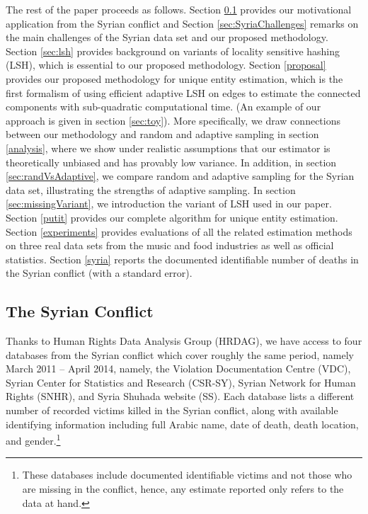 \documentclass{imsart}
\begin{document}
The rest of the paper proceeds as follows. Section \ref{syriadata} provides our motivational application from the Syrian conflict
and Section \ref{sec:SyriaChallenges} remarks on the main challenges of the Syrian data set and our proposed methodology. Section \ref{sec:lsh} provides background on variants of locality sensitive hashing (LSH), which is essential to our proposed methodology.  Section \ref{proposal} provides our proposed methodology for unique entity estimation, which is the first formalism of using efficient adaptive LSH on edges to estimate the connected components with sub-quadratic computational time. (An example of our approach is given in section \ref{sec:toy}). More specifically, we draw connections between our methodology and
 random and adaptive sampling in section \ref{analysis}, where we show under realistic assumptions that our estimator is theoretically unbiased and has provably low variance. In addition, in section \ref{sec:randVsAdaptive}, we compare random and adaptive sampling for the Syrian data set, illustrating the strengths of adaptive sampling. In section \ref{sec:missingVariant}, we introduction the variant of LSH used in our paper. Section \ref{putit} provides our complete algorithm for unique entity estimation.
Section \ref{experiments} provides evaluations of all the related estimation methods on three real data sets from the music and food industries as well as official statistics. Section \ref{syria} reports the documented identifiable number of deaths in the Syrian conflict (with a standard error).



\subsection{The Syrian Conflict}
\label{syriadata}
Thanks to Human Rights Data Analysis Group (HRDAG), we have access to four databases from the Syrian conflict which cover roughly the same period, namely March 2011 -- April 2014, namely, the Violation Documentation Centre (VDC), Syrian Center for Statistics and Research (CSR-SY), Syrian Network for Human Rights (SNHR), and Syria Shuhada website (SS). Each database lists a different number of recorded victims killed in the Syrian conflict, along with available identifying information including full Arabic name, date of death, death location, and gender.\footnote{These databases include documented identifiable victims and not those who are missing in the conflict, hence, any estimate reported only refers to the data at hand.}
\end{document}
